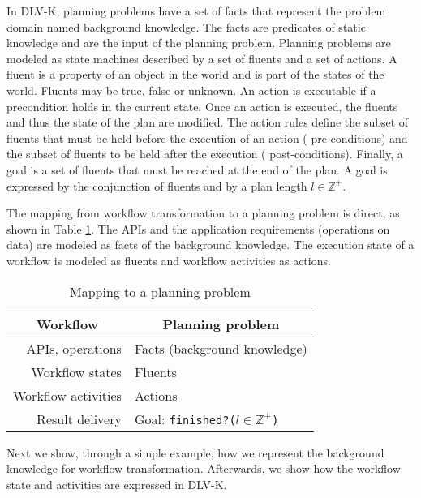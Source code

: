 In DLV-K, planning problems have a set of facts that represent the problem domain named background knowledge. The facts are predicates of static knowledge and are the input of the planning problem. Planning problems are modeled as state machines described by a set of fluents and a set of actions. A fluent is a property of an object in the world and is part of the states of the world. Fluents may be true, false or unknown. An action is executable if a precondition holds in the current state. Once an action is executed, the fluents and thus the state of the plan are modified. The action rules define the subset of fluents that must be held before the execution of an action (\ie{} pre-conditions) and the subset of fluents to be held after the execution (\ie{} post-conditions). Finally, a goal is a set of fluents that must be reached at the end of the plan. A goal is expressed by the conjunction of fluents and by a plan length $l \in \mathds{Z}^{+}$.

The mapping from workflow transformation to a planning problem is direct, as shown in Table \ref{tab:mappingQW-PP}. The APIs and the application requirements (operations on data) are modeled as facts of the background knowledge. The execution state of a workflow is modeled as fluents and workflow activities as actions.

	\begin{table}
	   \begin{center}
	      \begin{tabular}{|r|l|}
	         \hline
	         \multicolumn{1}{|c|}{\textbf{Workflow }}& \multicolumn{1}{c|}{\textbf{Planning problem}} \\
	         \hline
	         APIs, operations & Facts (background knowledge) \\
	         \hline
	         Workflow states & Fluents \\
	         \hline
	         Workflow activities & Actions \\
	         \hline
	         Result delivery & Goal: \texttt{finished?(}$l \in \mathds{Z}^{+}$\texttt{)} \\
	         \hline
	      \end{tabular}
	   \end{center} 
	   \caption{Mapping to a planning problem}
	   \label{tab:mappingQW-PP}
	\end{table}

Next we show, through a simple example, how we represent the background knowledge for workflow transformation. Afterwards, we show how the workflow state and activities are expressed in DLV-K.


